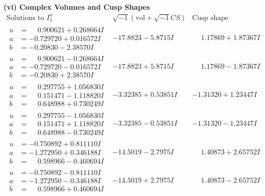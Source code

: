 \documentclass[1p]{elsarticle_modified}
\theoremstyle{definition}
\newcommand{\I}{\sqrt{-1}}
\begin{document}
\newpage\flushleft \textbf{(vi) Complex Volumes and Cusp Shapes}
$$\begin{array}{c|c|c}  
\text{Solutions to }I^u_{1}& \I (\text{vol} + \sqrt{-1}CS) & \text{Cusp shape}\\
 \hline 
\begin{aligned}
u &= \phantom{-}0.900621 + 0.268664 I \\
a &= -0.729720 + 0.016572 I \\
b &= -0.20830 - 2.38570 I\end{aligned}
 & -17.8823 - 5.8715 I & \phantom{-}1.17869 + 1.87367 I \\ \hline\begin{aligned}
u &= \phantom{-}0.900621 - 0.268664 I \\
a &= -0.729720 - 0.016572 I \\
b &= -0.20830 + 2.38570 I\end{aligned}
 & -17.8823 + 5.8715 I & \phantom{-}1.17869 - 1.87367 I \\ \hline\begin{aligned}
u &= \phantom{-}0.297755 + 1.056830 I \\
a &= \phantom{-}0.151471 - 1.118820 I \\
b &= \phantom{-}0.648988 + 0.730249 I\end{aligned}
 & -3.32385 + 0.53851 I & -1.31320 + 1.23447 I \\ \hline\begin{aligned}
u &= \phantom{-}0.297755 - 1.056830 I \\
a &= \phantom{-}0.151471 + 1.118820 I \\
b &= \phantom{-}0.648988 - 0.730249 I\end{aligned}
 & -3.32385 - 0.53851 I & -1.31320 - 1.23447 I \\ \hline\begin{aligned}
u &= -0.750892 + 0.811110 I \\
a &= -1.272950 + 0.346188 I \\
b &= \phantom{-}0.598966 - 0.460694 I\end{aligned}
 & -14.5019 - 2.7975 I & \phantom{-}1.40873 + 2.65752 I \\ \hline\begin{aligned}
u &= -0.750892 - 0.811110 I \\
a &= -1.272950 - 0.346188 I \\
b &= \phantom{-}0.598966 + 0.460694 I\end{aligned}
 & -14.5019 + 2.7975 I & \phantom{-}1.40873 - 2.65752 I \\ \hline\begin{aligned}

\end{aligned}
\end{array}$$
\end{document}
